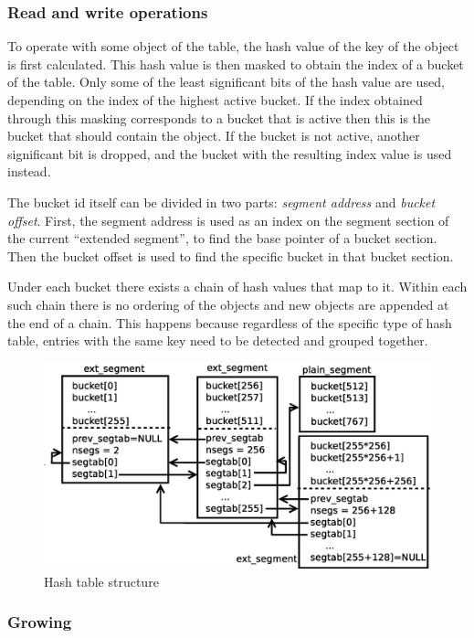 \documentclass[aps,pre,preprint,nofootinbib]{revtex4}
\begin{document}
\subsubsection{Read and write operations}

To operate with some object of the table, the hash value of the key of the object is first calculated.
This hash value is then masked to obtain the index of a bucket of the table.
Only some of the least significant bits of the hash value are used, depending on the index of the highest active bucket.
If the index obtained through this masking corresponds to a bucket that is active then this is the bucket that should contain the object.
If the bucket is not active, another significant bit is dropped, and the bucket with the resulting index value is used instead.

The bucket id itself can be divided in two parts: \emph{segment address} and \emph{bucket offset}.
First, the segment address is used as an index on the segment section of the current ``extended segment'', to find the base pointer of a bucket section.
Then the bucket offset is used to find the specific bucket in that bucket section.

Under each bucket there exists a chain of hash values that map to it.
Within each such chain there is no ordering of the objects and new objects are appended at the end of a chain.
This happens because regardless of the specific type of hash table, entries with the same key need to be detected and grouped together.

\begin{figure}[htb]
  \centering
  \includegraphics[width=1.0\textwidth]{hash_table_structure.eps}
  \caption{Hash table structure}
  \label{fig:hash_table_structure}
\end{figure}

\subsubsection{Growing}
\end{document}

